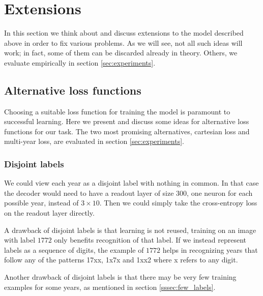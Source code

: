\section{Extensions}

In this section we think about and discuss extensions to the model described above in order to fix various problems.
As we will see, not all such ideas will work; in fact, some of them can be discarded already in theory. Others, we evaluate empirically in section \ref{sec:experiments}.


\subsection{Alternative loss functions} \label{ssec:alt_loss}

Choosing a suitable loss function for training the model is paramount to successful learning.
Here we present and discuss some ideas for alternative loss functions for our task.
The two most promising alternatives, cartesian loss and multi-year loss, are evaluated in section \ref{sec:experiments}.


\subsubsection{Disjoint labels}


We could view each year as a disjoint label with nothing in common. In that case the decoder would need to have a readout layer of size $300$, one neuron for each possible year, instead of $3 \times 10$. Then we could simply take the cross-entropy loss on the readout layer directly.

A drawback of disjoint labels is that learning is not reused, training on an image with label $1772$ only benefits recognition of that label.
If we instead represent labels as a sequence of digits, the example of $1772$ helps in recognizing years that follow any of the patterns 17xx, 1x7x and 1xx2 where x refers to any digit.

Another drawback of disjoint labels is that there may be very few training examples for some years, as mentioned in section \ref{sssec:few_labels}.

